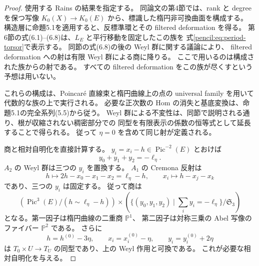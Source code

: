 \begin{proof}
使用する Rains の結果を指定する。
同論文の第4節では、rank と degree を保つ写像
$K_0(X)\to K_0(E)$ から、標識した楕円非可換曲面を構成する。
構造層に命題5.1を適用すると、反標準環とその filtered deformation を得る。
第6節の式(6.1)--(6.8)は、$L_E$ と平行移動を固定したこの族を
式\eqref{pencil:eq:period-torsor}で表示する。
同節の式(6.8)の後の Weyl 群に関する議論により、
filtered deformation への射は有限 Weyl 群による商に降りる。
ここで用いるのは構成された族からの射である。
すべての filtered deformation をこの族が尽くすという予想は用いない。

これらの構成は、Poincar\'e 直線束と楕円曲線上の点の universal family を用いて
代数的な族の上で実行される。
必要な正次数の Hom の消失と基底変換は、命題5.1の完全系列(5.5)から従う。
Weyl 群による不変性は、同節で説明される通り、根が収縮されない稠密部分での
同型を有限表示の係数の恒等式として延長することで得られる。
従って $\eta=0$ を含めて同じ射が定義される。

商と相対自明化を直接計算する。
$y_i=x_i-h\in\operatorname{Pic}^{-2}(E)$ とおけば
\[
 y_0+y_1+y_2=-\ell_\eta.
\]
$A_2$ の Weyl 群は三つの $y_i$ を置換する。
$A_1$ の Cremona 反射は
\[
 h\longmapsto2h-x_0-x_1-x_2=\ell_\eta-h,
 \qquad x_i\longmapsto h-x_j-x_k
\]
であり、三つの $y_i$ は固定する。
従って商は
\[
 \left(\operatorname{Pic}^3(E)/(h\sim\ell_\eta-h)\right)
 \times
 \left(\{(y_0,y_1,y_2)\mid\textstyle\sum_i y_i=-\ell_\eta\}/\mathfrak S_3\right)
\]
となる。第一因子は楕円曲線の二重商 $\mathbb P^1$、
第二因子は対称三乗の Abel 写像のファイバー $\mathbb P^2$ である。
さらに
\begin{equation}\label{pencil:eq:relative-period-trivialization}
 h=h^{(0)}-3\eta,\qquad
 x_i=x_i^{(0)}-\eta,\qquad
 y_i=y_i^{(0)}+2\eta
\end{equation}
は $T_0\times U\to T_U$ の同型であり、上の Weyl 作用と可換である。
これが必要な相対自明化を与える。


\end{proof}

